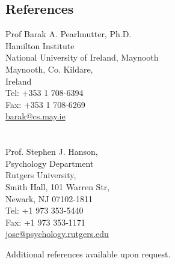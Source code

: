 \documentclass[10pt,overlapped,line]{res}
\begin{document}
\begin{resume}
 \section{References}
  \begin{multicols}{2}
 {\small
    Prof Barak A. Pearlmutter, Ph.D. \\
    Hamilton Institute \\
    National University of Ireland, Maynooth \\
    Maynooth, Co. Kildare, \\
    Ireland \\
    Tel: +353 1 708-6394\\
    Fax: +353 1 708-6269\\
    \url{barak@cs.may.ie} \\
\\
\\
    Prof. Stephen J. Hanson, \\
    Psychology Department \\
    Rutgers University, \\
    Smith Hall, 101 Warren Str, \\
    Newark, NJ 07102-1811 \\
    Tel: +1 973 353-5440 \\
    Fax: +1 973 353-1171 \\
    \url{jose@psychology.rutgers.edu} \\
 }
 \end{multicols}

Additional references available upon request.



\end{resume}
\end{document}

